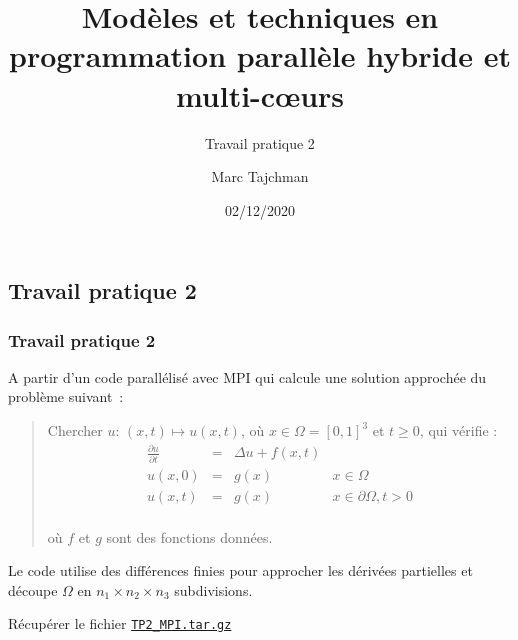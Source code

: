 \documentclass{beamer}
\title{Modèles et techniques en programmation parallèle hybride et multi-c\oe urs}
\subtitle{Travail pratique 2}
\author{Marc Tajchman}\institute{CEA - DEN/DM2S/STMF/LMES}
\date{02/12/2020}
\newcommand\Frac[2]{\frac{\displaystyle #1}{\displaystyle #2}}
\begin{document}
\begin{frame}
	\titlepage
\end{frame}

\large
\begin{frame}
	\section{Travail pratique 2}
	\frametitle{Travail pratique 2}

A partir d'un code parallélisé avec MPI qui calcule une solution approchée du problème suivant~:

\medskip
\begin{quote}
Chercher $u$:  $(x, t) \mapsto u(x, t)$, où  $x \in \Omega = [0,1]^3$ et $t \geq 0$, qui vérifie :
$$
\begin{array}{lcll}
\Frac{\partial u}{\partial t} & = & \Delta u + f(x, t) & \\[0.3cm]
u(x, 0) &=& g(x) & x\in \Omega \\[0.3cm]
u(x, t) & = & g(x) & x\in\partial \Omega, t > 0\\[0.3cm]
\end{array}
$$

\vspace{-0.6cm}
où $f$ et $g$ sont des fonctions données.
\end{quote}

Le code utilise des différences finies pour approcher les dérivées partielles et découpe $\Omega$ en $n_1\times n_2\times n_3$ subdivisions.

Récupérer le fichier \href{https://perso.ensta-paris.fr/~tajchman/Seance5/TP2_MPI.tar.gz}{\tt TP2\_MPI.tar.gz}
\end{frame}
\end{document}
